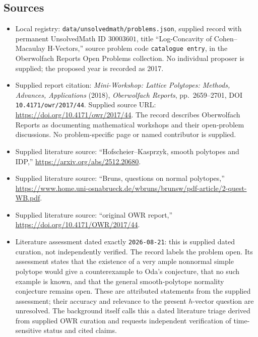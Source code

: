 \documentclass[11pt]{article}
\begin{document}
\subsection{Sources}
\begin{itemize}
\item Local registry: \texttt{data/unsolvedmath/problems.json}, supplied record with permanent UnsolvedMath ID \(30003601\), title ``Log-Concavity of Cohen--Macaulay H-Vectors,'' source problem code \texttt{catalogue entry}, in the Oberwolfach Reports Open Problems collection. No individual proposer is supplied; the proposed year is recorded as 2017.
\item Supplied report citation: \emph{Mini-Workshop: Lattice Polytopes: Methods, Advances, Applications} (2018), \emph{Oberwolfach Reports}, pp.\ 2659--2701, DOI \texttt{10.4171/owr/2017/44}. Supplied source URL: \url{https://doi.org/10.4171/owr/2017/44}. The record describes Oberwolfach Reports as documenting mathematical workshops and their open-problem discussions. No problem-specific page or named contributor is supplied.
\item Supplied literature source: ``Hofscheier--Kasprzyk, smooth polytopes and IDP,'' \url{https://arxiv.org/abs/2512.20680}.
\item Supplied literature source: ``Bruns, questions on normal polytopes,'' \url{https://www.home.uni-osnabrueck.de/wbruns/brunsw/pdf-article/2-quest-WB.pdf}.
\item Supplied literature source: ``original OWR report,'' \url{https://doi.org/10.4171/OWR/2017/44}.
\item Literature assessment dated exactly \texttt{2026-08-21}: this is supplied dated curation, not independently verified. The record labels the problem open. Its assessment states that the existence of a very ample nonnormal simple polytope would give a counterexample to Oda's conjecture, that no such example is known, and that the general smooth-polytope normality conjecture remains open. These are attributed statements from the supplied assessment; their accuracy and relevance to the present \(h\)-vector question are unresolved. The background itself calls this a dated literature triage derived from supplied OWR curation and requests independent verification of time-sensitive status and cited claims.
\end{itemize}
\end{document}
